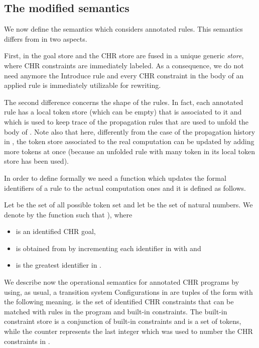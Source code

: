 \documentclass[final]{acmtrans2e}
\begin{document}
\subsection{The  modified semantics }
We now define the semantics  which considers annotated rules.
This semantics differs from  in two aspects.

First, in 
the goal store and the CHR store are fused in a unique generic \emph{store}, where
CHR constraints are immediately labeled. As a consequence, we do not
need anymore the Introduce rule and every CHR
constraint in the body of an applied rule is immediately
utilizable for rewriting.

The second difference concerns the shape of the rules. In fact,
each annotated rule  has  a local token store (which can be
empty) that is associated to it and which is used to keep trace of
the propagation rules that are used to unfold the body of .
Note also that here, differently from the case of the propagation
history in , the token store associated to
 the real computation can be updated
by adding more tokens at once (because an unfolded rule with many
token in its local token store has been used).

In order to define formally 
we need a function   which updates
the formal identifiers of a rule to the actual computation ones and it
is defined as follows.

\begin{definition}\label{definst}
 Let  be the set of all possible token
set and let  be the set of natural numbers. We denote
by  the function such that
), where
\begin{itemize}
    \item  is an identified CHR goal,
    \item  is obtained from  by
    incrementing each identifier in  with  and
    \item  is the greatest identifier in .
\end{itemize}
\end{definition}

We describe now the operational semantics   for annotated CHR
programs  by using, as usual, a transition system
 Configurations in
 are tuples of the form  with the following meaning.   is the set of
identified CHR constraints that can be matched with rules in the
program  and built-in constraints. The built-in constraint
store  is a conjunction of built-in constraints and  is a
set of tokens, while the counter  represents the last integer
which  was used to number  the CHR constraints in .
\end{document}
